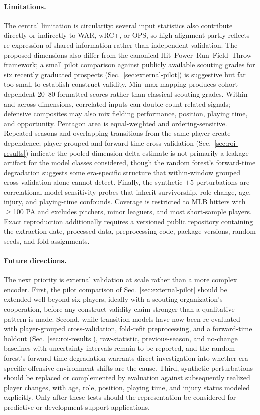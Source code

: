 \documentclass[10pt,twocolumn,letterpaper]{article}
\begin{document}
\paragraph{Limitations.}
The central limitation is circularity: several input statistics also contribute directly or indirectly to WAR, wRC+, or OPS, so high alignment partly reflects re-expression of shared information rather than independent validation. The proposed dimensions also differ from the canonical Hit--Power--Run--Field--Throw framework; a small pilot comparison against publicly available scouting grades for six recently graduated prospects (Sec.~\ref{sec:external-pilot}) is suggestive but far too small to establish construct validity. Min--max mapping produces cohort-dependent 20--80-formatted scores rather than classical scouting grades. Within and across dimensions, correlated inputs can double-count related signals; defensive composites may also mix fielding performance, position, playing time, and opportunity. Pentagon area is equal-weighted and ordering-sensitive. Repeated seasons and overlapping transitions from the same player create dependence; player-grouped and forward-time cross-validation (Sec.~\ref{sec:roi-results}) indicate the pooled dimension-delta estimate is not primarily a leakage artifact for the model classes considered, though the random forest's forward-time degradation suggests some era-specific structure that within-window grouped cross-validation alone cannot detect. Finally, the synthetic $+5$ perturbations are correlational model-sensitivity probes that inherit survivorship, role-change, age, injury, and playing-time confounds. Coverage is restricted to MLB hitters with $\geq$100 PA and excludes pitchers, minor leaguers, and most short-sample players. Exact reproduction additionally requires a versioned public repository containing the extraction date, processed data, preprocessing code, package versions, random seeds, and fold assignments.

\paragraph{Future directions.}
The next priority is external validation at scale rather than a more complex encoder. First, the pilot comparison of Sec.~\ref{sec:external-pilot} should be extended well beyond six players, ideally with a scouting organization's cooperation, before any construct-validity claim stronger than a qualitative pattern is made. Second, while transition models have now been re-evaluated with player-grouped cross-validation, fold-refit preprocessing, and a forward-time holdout (Sec.~\ref{sec:roi-results}), raw-statistic, previous-season, and no-change baselines with uncertainty intervals remain to be reported, and the random forest's forward-time degradation warrants direct investigation into whether era-specific offensive-environment shifts are the cause. Third, synthetic perturbations should be replaced or complemented by evaluation against subsequently realized player changes, with age, role, position, playing time, and injury status modeled explicitly. Only after these tests should the representation be considered for predictive or development-support applications.
\end{document}
